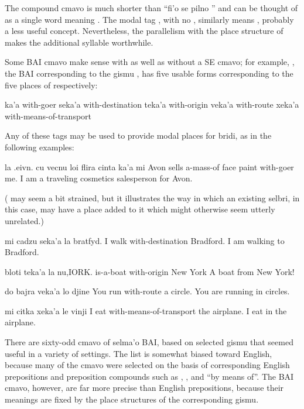 The compound cmavo  is much shorter than ``fi'o se
    pilno '' and can be thought of as a single word meaning
    . The modal tag , with no ,
    similarly means , probably a less useful
    concept. Nevertheless, the parallelism with the place structure
    of  makes the additional syllable worthwhile.

Some BAI cmavo make sense with as well as without a SE
    cmavo; for example, , the BAI corresponding to the
    gismu , has five usable forms corresponding to the
    five places of  respectively:

   ka'a        with-goer
    seka'a      with-destination
    teka'a      with-origin
    veka'a      with-route
    xeka'a      with-means-of-transport

Any of these tags may be used to provide modal places for
    bridi, as in the following examples:
\begin{example}
la .eivn. cu vecnu loi flira cinta ka'a mi\n
Avon sells a-mass-of face paint with-goer me.\n
I am a traveling cosmetics salesperson for Avon.
\end{example}

( may seem a bit strained, but
    it illustrates the way in which an existing selbri, 
    in this case, may have a place added to it which might
    otherwise seem utterly unrelated.)
\begin{example}
mi cadzu seka'a la bratfyd.\n
I walk with-destination Bradford.\n
I am walking to Bradford.
\end{example}

\begin{example}
bloti teka'a la nu,IORK.\n
{} is-a-boat with-origin New York\n
A boat from New York!
\end{example}

\begin{example}
do bajra veka'a lo djine\n
You run with-route a circle.\n
You are running in circles.
\end{example}

\begin{example}
mi citka xeka'a le vinji\n
I eat with-means-of-transport the airplane.\n
I eat in the airplane.
\end{example}

There are sixty-odd cmavo of selma'o BAI, based on selected
    gismu that seemed useful in a variety of settings. The list is
    somewhat biased toward English, because many of the cmavo were
    selected on the basis of corresponding English prepositions and
    preposition compounds such as , , and ``by
    means of''. The BAI cmavo, however, are far more precise than
    English prepositions, because their meanings are fixed by the
    place structures of the corresponding gismu. 

